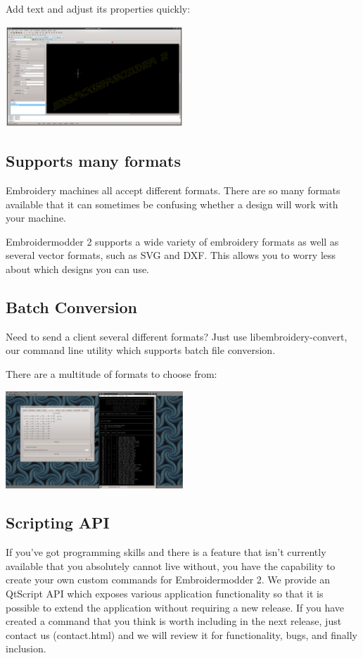 \documentclass[10pt]{report}
\begin{document}
Add text and adjust its properties quickly:

\includegraphics[width=0.5\textwidth]{images/features-text-1.png}

\subsection{Supports many formats}

Embroidery machines all accept different formats. There are so many formats
available that it can sometimes be confusing whether a design will work with your machine.

Embroidermodder 2 supports a wide variety of embroidery formats as well as several vector
formats, such as SVG and DXF. This allows you to worry less about which designs you can use.

\subsection{Batch Conversion}

Need to send a client several different formats? Just use libembroidery-convert, our command
line utility which supports batch file conversion.

There are a multitude of formats to choose from:

\includegraphics[width=0.5\textwidth]{images/features-formats-1.png}

\subsection{Scripting API}

If you've got programming skills and there is a feature that isn't currently available that you
absolutely cannot live without, you have the capability to create your own custom commands for
Embroidermodder 2. We provide an QtScript API which exposes various application functionality
so that it is possible to extend the application without requiring a new release. If you have
created a command that you think is worth including in the next release, just  contact
us (contact.html) and we will review it for functionality, bugs, and finally inclusion.
\end{document}
